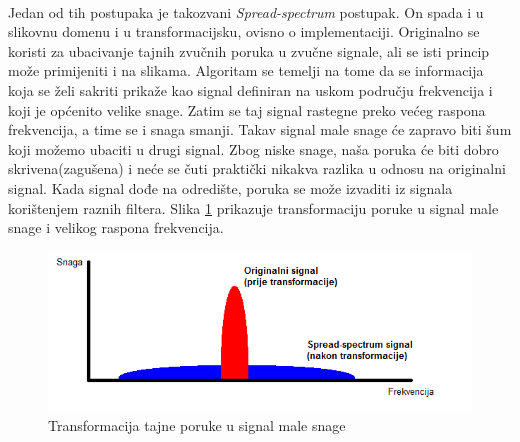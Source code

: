 \documentclass[times, utf8, seminar]{fer}
\begin{document}
\paragraph{}
Jedan od tih postupaka je takozvani \textit{Spread-spectrum} postupak. On spada i u slikovnu domenu i u transformacijsku, ovisno o implementaciji. Originalno se koristi za ubacivanje tajnih zvučnih poruka u zvučne signale, ali se isti princip može primijeniti i na slikama. Algoritam se temelji na tome da se informacija koja se želi sakriti prikaže kao signal definiran na uskom području frekvencija i koji je općenito velike snage. Zatim se taj signal rastegne preko većeg raspona frekvencija, a time se i snaga smanji. Takav signal male snage će zapravo biti šum koji možemo ubaciti u drugi signal. Zbog niske snage, naša poruka će biti dobro skrivena(zagušena) i neće se čuti praktički nikakva razlika u odnosu na originalni signal. Kada signal dođe na odredište, poruka se može izvaditi iz signala korištenjem raznih filtera.  Slika \ref{transfrom} prikazuje transformaciju poruke u signal male snage i velikog raspona frekvencija.
\begin{figure}
\caption{Transformacija tajne poruke u signal male snage}
\label{transfrom}
\centerline{\includegraphics[scale=0.8]{images/transformation.png}}
\end{figure}
\end{document}
